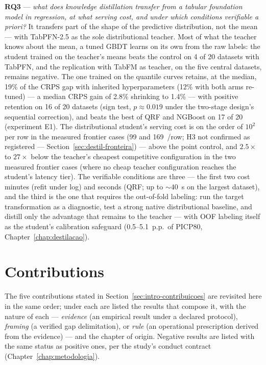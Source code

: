 \textbf{RQ3} --- \emph{what does knowledge distillation transfer from
a tabular foundation model in regression, at what serving cost, and
under which conditions verifiable a priori?} It transfers part of the
shape of the predictive distribution, not the mean --- with
TabPFN-2.5 as the sole distributional teacher. Most of what
the teacher knows about the mean, a tuned GBDT learns on its own from
the raw labels: the student trained on the teacher's means beats the
control on 4 of 20 datasets with TabPFN, and the replication with
TabFM as teacher, on the five central datasets, remains negative. The
one trained on the quantile curves retains, at the median, 19\% of
the CRPS gap with inherited hyperparameters (12\% with both arms
re-tuned) --- a median CRPS gain of 2.8\% shrinking to 1.4\% --- with
positive retention on 16 of 20 datasets (sign test,
$p\approx0.019$ under the two-stage design's sequential correction),
and beats the best of QRF and NGBoost on 17 of 20 (experiment E1).
The distributional student's serving cost is on the order of
$10^{2}$~\us{} per row in the measured frontier cases (99 and
169~\us/row; H3 not confirmed as registered ---
Section~\ref{sec:destil-fronteira}) --- above the point
control, and $2.5\times$ to $27\times$ below the teacher's cheapest
competitive configuration in the two measured frontier cases
(where no cheap teacher configuration reaches the student's latency
tier). The
verifiable conditions are three --- the first two cost minutes
(refit under log) and seconds (QRF;
up to ${\sim}40$~s on the largest dataset), and the third is the
one that requires the out-of-fold
labeling: run the target transformation as a diagnostic, test a
strong
native distributional baseline, and distill only the advantage that
remains to the teacher --- with OOF labeling itself as the student's
calibration safeguard (0.5--5.1~p.p.\ of PICP80,
Chapter~\ref{chap:destilacao}).

\section{Contributions}
\label{sec:conc-contribuicoes}

The five contributions stated in
Section~\ref{sec:intro-contribuicoes} are revisited here in the same
order; under each are listed the results that compose it, with the
nature of each --- \emph{evidence} (an empirical result under a
declared protocol), \emph{framing} (a verified gap delimitation), or
\emph{rule} (an operational prescription derived from the evidence)
--- and the chapter of origin. Negative results are listed with the
same status as positive ones, per the study's conduct contract
(Chapter~\ref{chap:metodologia}).

